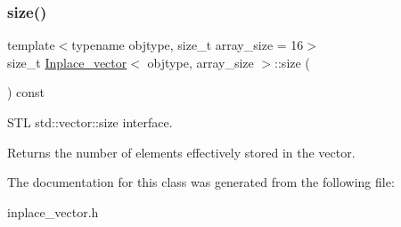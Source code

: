 \subsubsection{\texorpdfstring{size()}{size()}}
{\footnotesize\ttfamily template$<$typename objtype, size\+\_\+t array\+\_\+size = 16$>$ \\
size\+\_\+t \mbox{\hyperlink{classInplace__vector}{Inplace\+\_\+vector}}$<$ objtype, array\+\_\+size $>$\+::size (\begin{DoxyParamCaption}{ }\end{DoxyParamCaption}) const\hspace{0.3cm}{\ttfamily [inline]}}

S\+TL std\+::vector\+::size interface. \begin{DoxyReturn}{Returns}
the number of elements effectively stored in the vector. 
\end{DoxyReturn}


The documentation for this class was generated from the following file\+:\begin{DoxyCompactItemize}
\item 
inplace\+\_\+vector.\+h\end{DoxyCompactItemize}
